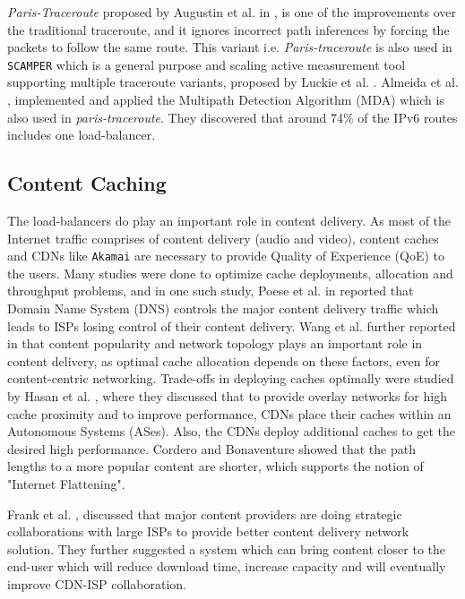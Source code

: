 \textit{Paris-Traceroute} proposed by Augustin et al. in \cite{internetbrice}, is one of the improvements over the traditional traceroute, and it ignores incorrect path inferences by forcing the
packets to follow the same route. This variant i.e. \textit{Paris-traceroute} is also used in \texttt{SCAMPER} which is a general purpose and scaling active measurement tool supporting multiple traceroute variants, 
proposed by Luckie et al. \cite{scamper}. Almeida et al. \cite{loadrafael}, implemented and applied the Multipath Detection Algorithm (MDA) which is also used in \textit{paris-traceroute}. They discovered that around
74\% of the IPv6 routes includes one load-balancer. 

\subsection*{Content Caching}

The load-balancers do play an important role in content delivery. As most of the Internet traffic comprises of content delivery (audio and video), content caches and CDNs like \texttt{Akamai}
are necessary to provide Quality of Experience (QoE) to the users. Many studies were done to optimize cache deployments, allocation and throughput problems, and in one such study, Poese
et al. in \cite{cc2} reported that Domain Name System (DNS) controls the major content delivery traffic which leads to ISPs losing control of their content delivery.
Wang et al. further reported in \cite{cc1} that content popularity and network topology plays an important role in content delivery, as optimal cache allocation depends on these factors, even
for content-centric networking. Trade-offs in deploying caches optimally were studied by Hasan et al. \cite{cachehasan}, where they discussed that to provide overlay networks for high cache proximity
and to improve performance, CDNs place their caches within an Autonomous Systems (ASes). Also, the CDNs deploy additional caches to get the desired high performance. Cordero and Bonaventure \cite{cc4}
showed that the path lengths to a more popular content are shorter, which supports the notion of "Internet Flattening". 

Frank et al. \cite{cc3}, discussed that major content providers are doing strategic collaborations with large ISPs to provide better content delivery network solution. They further suggested a system
which can bring content closer to the end-user which will reduce download time, increase capacity and will eventually improve CDN-ISP collaboration. 

